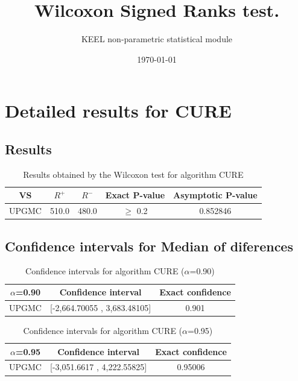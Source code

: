 \documentclass[a4paper,10pt]{article}
\title{Wilcoxon Signed Ranks test.}
\date{\today}
\author{KEEL non-parametric statistical module}
\begin{document}
\pagestyle{empty}
\maketitle
\thispagestyle{empty}



\section{Detailed results for CURE}


\subsection{Results}

\begin{table}[!htp]
\centering\small
\begin{tabular}{
|c|c|c|c|c|}
\hline
 VS & $R^{+}$ & $R^{-}$ & Exact P-value & Asymptotic P-value \\ \hline 
UPGMC & 510.0 & 480.0 & $\geq$ 0.2 & 0.852846\\ \hline 

\end{tabular}
\caption{Results obtained by the Wilcoxon test for algorithm CURE}
\end{table}

\subsection{Confidence intervals for Median of diferences}

\begin{table}[!htp]
\centering\small
\begin{tabular}{
|c|c|c|}
\hline
 $\alpha$=0.90 & Confidence interval & Exact confidence \\ \hline 
UPGMC & [-2,664.70055 , 3,683.48105] & 0.901\\ \hline 

\end{tabular}
\caption{Confidence intervals for algorithm CURE ($\alpha$=0.90)}
\end{table}
\begin{table}[!htp]
\centering\small
\begin{tabular}{
|c|c|c|}
\hline
 $\alpha$=0.95 & Confidence interval & Exact confidence \\ \hline 
UPGMC & [-3,051.6617 , 4,222.55825] & 0.95006\\ \hline 

\end{tabular}
\caption{Confidence intervals for algorithm CURE ($\alpha$=0.95)}
\end{table}
\end{document}

